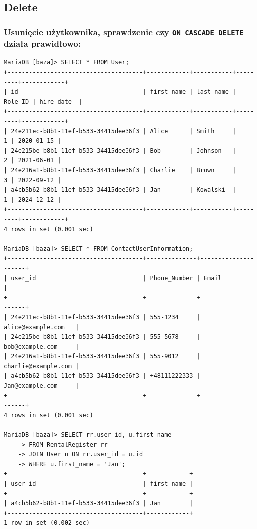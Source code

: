 \documentclass{article}
\begin{document}
\subsection{Delete}

\subsubsection*{Usunięcie użytkownika, sprawdzenie czy \texttt{ON CASCADE DELETE} działa prawidłowo:}

\begin{verbatim}
MariaDB [baza]> SELECT * FROM User;
+--------------------------------------+------------+-----------+---------+------------+
| id                                   | first_name | last_name | Role_ID | hire_date  |
+--------------------------------------+------------+-----------+---------+------------+
| 24e211ec-b8b1-11ef-b533-34415dee36f3 | Alice      | Smith     |       1 | 2020-01-15 |
| 24e215be-b8b1-11ef-b533-34415dee36f3 | Bob        | Johnson   |       2 | 2021-06-01 |
| 24e216a1-b8b1-11ef-b533-34415dee36f3 | Charlie    | Brown     |       3 | 2022-09-12 |
| a4cb5b62-b8b1-11ef-b533-34415dee36f3 | Jan        | Kowalski  |       1 | 2024-12-12 |
+--------------------------------------+------------+-----------+---------+------------+
4 rows in set (0.001 sec)

MariaDB [baza]> SELECT * FROM ContactUserInformation;
+--------------------------------------+--------------+---------------------+
| user_id                              | Phone_Number | Email               |
+--------------------------------------+--------------+---------------------+
| 24e211ec-b8b1-11ef-b533-34415dee36f3 | 555-1234     | alice@example.com   |
| 24e215be-b8b1-11ef-b533-34415dee36f3 | 555-5678     | bob@example.com     |
| 24e216a1-b8b1-11ef-b533-34415dee36f3 | 555-9012     | charlie@example.com |
| a4cb5b62-b8b1-11ef-b533-34415dee36f3 | +48111222333 | Jan@example.com     |
+--------------------------------------+--------------+---------------------+
4 rows in set (0.001 sec)

MariaDB [baza]> SELECT rr.user_id, u.first_name 
    -> FROM RentalRegister rr 
    -> JOIN User u ON rr.user_id = u.id 
    -> WHERE u.first_name = 'Jan';
+--------------------------------------+------------+
| user_id                              | first_name |
+--------------------------------------+------------+
| a4cb5b62-b8b1-11ef-b533-34415dee36f3 | Jan        |
+--------------------------------------+------------+
1 row in set (0.002 sec)


\end{verbatim}
\end{document}
